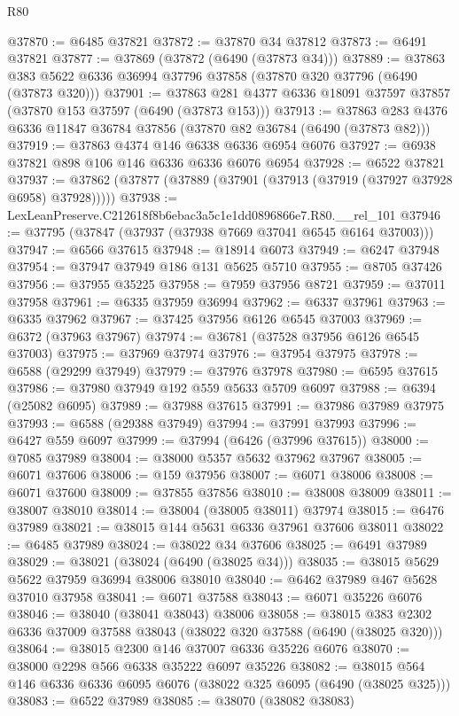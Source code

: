 \begin{lexlean}{R80}
\begin{coremodule}
@37870 := @6485 @37821
@37872 := @37870 @34 @37812
@37873 := @6491 @37821
@37877 := @37869 (@37872 (@6490 (@37873 @34)))
@37889 := @37863 @383 @5622 @6336 @36994 @37796 @37858 (@37870 @320 @37796 (@6490 (@37873 @320)))
@37901 := @37863 @281 @4377 @6336 @18091 @37597 @37857 (@37870 @153 @37597 (@6490 (@37873 @153)))
@37913 := @37863 @283 @4376 @6336 @11847 @36784 @37856 (@37870 @82 @36784 (@6490 (@37873 @82)))
@37919 := @37863 @4374 @146 @6338 @6336 @6954 @6076
@37927 := @6938 @37821 @898 @106 @146 @6336 @6336 @6076 @6954
@37928 := @6522 @37821
@37937 := @37862 (@37877 (@37889 (@37901 (@37913 (@37919 (@37927 @37928 @6958) @37928)))))
@37938 := LexLeanPreserve.C212618f8b6ebac3a5c1e1dd0896866e7.R80.__rel_101
@37946 := @37795 (@37847 (@37937 (@37938 @7669 @37041 @6545 @6164 @37003)))
@37947 := @6566 @37615
@37948 := @18914 @6073
@37949 := @6247 @37948
@37954 := @37947 @37949 @186 @131 @5625 @5710
@37955 := @8705 @37426
@37956 := @37955 @35225
@37958 := @7959 @37956 @8721
@37959 := @37011 @37958
@37961 := @6335 @37959 @36994
@37962 := @6337 @37961
@37963 := @6335 @37962
@37967 := @37425 @37956 @6126 @6545 @37003
@37969 := @6372 (@37963 @37967)
@37974 := @36781 (@37528 @37956 @6126 @6545 @37003)
@37975 := @37969 @37974
@37976 := @37954 @37975
@37978 := @6588 (@29299 @37949)
@37979 := @37976 @37978
@37980 := @6595 @37615
@37986 := @37980 @37949 @192 @559 @5633 @5709 @6097
@37988 := @6394 (@25082 @6095)
@37989 := @37988 @37615
@37991 := @37986 @37989 @37975
@37993 := @6588 (@29388 @37949)
@37994 := @37991 @37993
@37996 := @6427 @559 @6097
@37999 := @37994 (@6426 (@37996 @37615))
@38000 := @7085 @37989
@38004 := @38000 @5357 @5632 @37962 @37967
@38005 := @6071 @37606
@38006 := @159 @37956
@38007 := @6071 @38006
@38008 := @6071 @37600
@38009 := @37855 @37856
@38010 := @38008 @38009
@38011 := @38007 @38010
@38014 := @38004 (@38005 @38011) @37974
@38015 := @6476 @37989
@38021 := @38015 @144 @5631 @6336 @37961 @37606 @38011
@38022 := @6485 @37989
@38024 := @38022 @34 @37606
@38025 := @6491 @37989
@38029 := @38021 (@38024 (@6490 (@38025 @34)))
@38035 := @38015 @5629 @5622 @37959 @36994 @38006 @38010
@38040 := @6462 @37989 @467 @5628 @37010 @37958
@38041 := @6071 @37588
@38043 := @6071 @35226 @6076
@38046 := @38040 (@38041 @38043) @38006
@38058 := @38015 @383 @2302 @6336 @37009 @37588 @38043 (@38022 @320 @37588 (@6490 (@38025 @320)))
@38064 := @38015 @2300 @146 @37007 @6336 @35226 @6076
@38070 := @38000 @2298 @566 @6338 @35222 @6097 @35226
@38082 := @38015 @564 @146 @6336 @6336 @6095 @6076 (@38022 @325 @6095 (@6490 (@38025 @325)))
@38083 := @6522 @37989
@38085 := @38070 (@38082 @38083)

\end{coremodule}
\end{lexlean}
